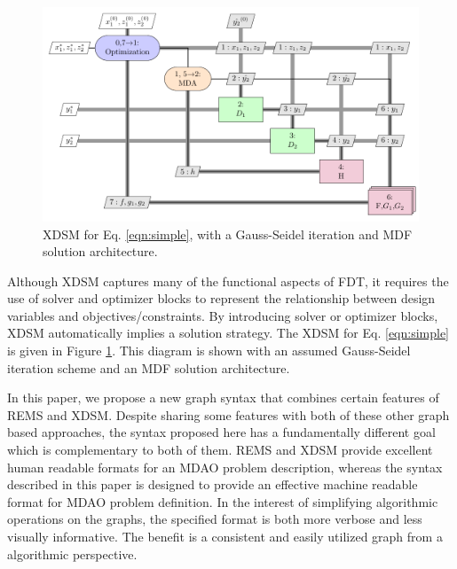     \begin{figure}
        \begin{center}
        \includegraphics[height=.25\textheight]{XDSM/simple}
        \caption{XDSM for Eq. \ref{eqn:simple}, with a Gauss-Seidel iteration 
          and MDF solution architecture. \label{fig:XDSM_simple}}
        \end{center}
    \end{figure}

    Although XDSM captures many of the functional aspects of FDT, it 
    requires the use of solver and optimizer blocks to represent 
    the relationship between design variables and objectives/constraints. 
    By introducing solver or optimizer blocks, XDSM automatically implies a solution strategy. 
    The XDSM for Eq. \ref{eqn:simple} is given in Figure \ref{fig:XDSM_simple}. 
    This diagram is shown with an assumed Gauss-Seidel iteration scheme and an MDF solution architecture. 

    In this paper, we propose a new graph syntax that combines certain features of REMS and XDSM. 
    Despite sharing some features with both of these other graph based approaches, the syntax
    proposed here has a fundamentally different goal which is complementary to both of them. 
    REMS and XDSM provide excellent human readable formats for an MDAO problem description, whereas the  
    syntax described in this paper is designed to provide an effective machine readable format for MDAO problem definition. 
    In the interest of simplifying algorithmic operations on the graphs, the specified 
    format is both more verbose and less visually informative. The benefit is a consistent 
    and easily utilized graph from a algorithmic perspective. 

